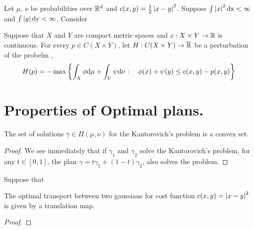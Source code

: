 \begin{theorem}
	Let $\mu$, $\nu$  be probabilities over $\mathbb{R}^d$ and $c(x,y)=\frac{1}{2}\left| x-y \right|^2$. Suppose $\int \left| x \right|^2 \mathrm{dx} <\infty$ and $\int \left| y \right|\mathrm{dy}<\infty$. Consider
\end{theorem}


\begin{definition}[Perturbation.]
	Suppose that $X$ and $Y$ are compact metric spaces and $c:X\times Y\rightarrow \mathbb{R}$ is continuous. For every $p\in C(X\times Y)$, let $H:C(X\times Y)\rightarrow \overline{\mathbb{R}}$ be a perturbation of the probelm ,
	\begin{equation}
		H(p)=-\max\left\lbrace \int_X\phi \mathrm{d}\mu + \int_Y\psi \mathrm{d}\nu: \quad \phi(x)+\psi(y)\leq c(x,y)-p(x,y) \right\rbrace
	\end{equation}	
\end{definition}

\section{Properties of Optimal plans.}

\begin{theorem}
The set of solutions $\bar\gamma\in\Pi(\mu,\nu)$ for the Kantorovich's problem is a convex set.
\end{theorem}
\begin{proof}
	We see immediately that if $\gamma_1$ and $\gamma_2$ solve the Kantorovich's problem, for any $t\in[0,1]$, the plan $\gamma=t\gamma_1+(1-t)\gamma_2$, also solves the problem. 
\end{proof}

\begin{lemma}
	Suppose that 
\end{lemma}

\begin{theorem}
	The optimal transport between two gaussians for cost function $c(x,y)=\left| x-y \right|^2$ is given by a translation map.
\end{theorem}

\begin{proof}
	
\end{proof}

